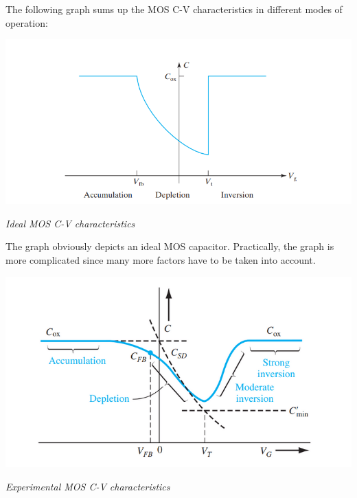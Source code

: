 \documentclass[12 pt]{article}
\begin{document}
The following graph sums up the MOS C-V characteristics in different modes of operation: 

\par
\begin{center}
    \includegraphics{MOS_C-V_characteristics.png}
\end{center}
\begin{center}
    \emph{\hspace{2.5 cm}Ideal MOS C-V characteristics\newline}
\end{center}
\par

The graph obviously depicts an ideal MOS capacitor. Practically, the graph is more complicated since many more factors have to be taken into account.

\par
\begin{center}
    \includegraphics{MOS_C-V_char.png}
\end{center}
\begin{center}
    \emph{\hspace{2.5 cm}Experimental MOS C-V characteristics\newline}
\end{center}
\par
\end{document}
